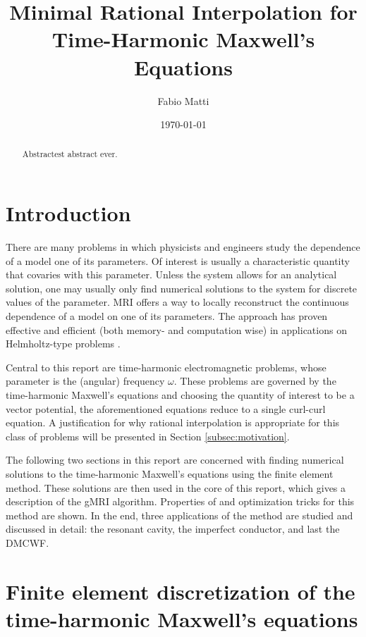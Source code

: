 \documentclass[11pt, a4paper]{article}
\title{Minimal Rational Interpolation for Time-Harmonic Maxwell's Equations}
\author{Fabio Matti}
\date{\today}
\begin{document}
\maketitle

\begin{abstract}
    Abstractest abstract ever.
\end{abstract}

\newpage
\printglossary[type=\acronymtype, nonumberlist]

\newpage
\tableofcontents

\newpage
\section{Introduction}
\label{sec:introduction}

There are many problems in which physicists and engineers study the dependence
of a model one of its parameters. 
Of interest is usually a characteristic quantity that covaries with this parameter.
Unless the system allows for an analytical solution, one may usually only
find numerical solutions to the system for discrete values of the parameter.
\acrfull{MRI} offers a way to locally reconstruct the continuous
dependence of a model on one of its parameters. The approach has proven 
effective and efficient (both memory- and computation wise) in applications
on Helmholtz-type problems \cite{greedyMRI, shortMRI}.

Central to this report are time-harmonic electromagnetic problems, whose 
parameter is the (angular) frequency $\omega$. These problems are governed by
the time-harmonic Maxwell's equations and choosing the quantity of interest
to be a vector potential, the aforementioned equations reduce to a single curl-curl equation.
A justification for why rational interpolation is appropriate for this class 
of problems will be presented in Section \ref{subsec:motivation}.

The following two sections in this report are concerned with finding numerical 
solutions to the time-harmonic Maxwell's equations using the finite element method.
These solutions are then used in the core of this report, which gives a description
of the \acrfull{gMRI} algorithm. Properties of and optimization tricks for this
method are shown. In the end, three applications of the method are studied and
discussed in detail: the resonant cavity, the imperfect conductor, and last
the \acrfull{DMCWF}.

\newpage
\section{Finite element discretization of the time-harmonic Maxwell's equations}
\label{sec:maxwell}
\end{document}
